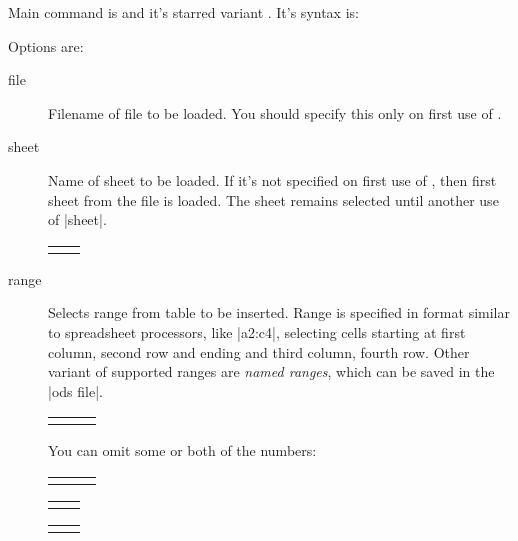 \documentclass{ltxdoc}
\begin{document}
\noindent Main command is 
and it's starred variant . It's syntax is:\\

Options are:

\begin{description}
\item[file] Filename of file to be loaded. You should specify this only on first use of .
\item[sheet] Name of sheet to be loaded. If it's not specified on first use of
  , then first sheet from the file is loaded. The sheet
  remains selected until another use of |sheet|.

\begin{LTXexample}
\begin{tabular}{l l}
\end{tabular}     
\end{LTXexample}

\item[range] Selects range from table to be inserted. Range is specified in
  format similar to spreadsheet processors, like |a2:c4|, selecting cells
  starting at first column, second row and ending and third column, fourth row.
  Other variant of supported ranges are \textit{named ranges}, which can be
  saved in the |ods file|.

\begin{LTXexample}
\begin{tabular}{lll}
\end{tabular}     
\end{LTXexample}
You can omit some or both of the numbers:
\begin{LTXexample}
\begin{tabular}{lll}
\end{tabular}     
\end{LTXexample}

\begin{LTXexample}
\begin{tabular}{ll}
\end{tabular}     
\end{LTXexample}
  
\begin{LTXexample}
\begin{tabular}{ll}
\end{tabular}     
\end{LTXexample}  


\end{description}
\end{document}
